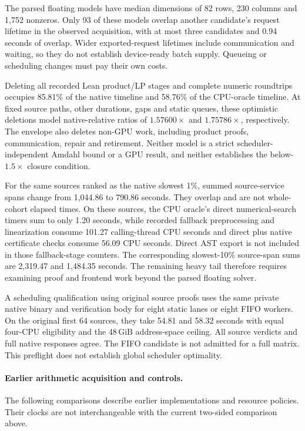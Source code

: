 \documentclass[10pt,twocolumn]{article}
\begin{document}
The parsed floating models have median dimensions of 82 rows, 230 columns
and 1,752 nonzeros. Only 93 of these models overlap another candidate's
request lifetime in the observed acquisition, with at most three candidates
and 0.94 seconds of overlap. Wider exported-request lifetimes include
communication and waiting, so they do not establish device-ready batch supply.
Queueing or scheduling changes must pay their own costs.

Deleting all recorded Lean product/LP stages and complete numeric roundtrips
occupies 85.81\% of the native timeline and 58.76\% of the CPU-oracle timeline.
At fixed source paths, other durations, gaps and static queues, these
optimistic deletions model native-relative ratios of $1.57600\times$ and
$1.75786\times$, respectively. The envelope also deletes non-GPU work,
including product proofs, communication, repair and retirement. Neither
model is a strict scheduler-independent Amdahl bound or a GPU result,
and neither establishes the below-$1.5\times$ closure condition.

For the same sources ranked as the native slowest 1\%, summed source-service
spans change from 1,044.86 to 790.86 seconds. They overlap and are not
whole-cohort elapsed times. On these sources, the CPU oracle's direct
numerical-search timers sum to only 1.20 seconds, while recorded fallback
preprocessing and linearization consume 101.27 calling-thread CPU seconds
and direct plus native certificate checks consume 56.09 CPU seconds.
Direct AST export is not included in those fallback-stage counters.
The corresponding slowest-10\% source-span sums are 2,319.47 and
1,484.35 seconds. The remaining heavy tail therefore requires examining
proof and frontend work beyond the parsed floating solver.

A scheduling qualification using original source proofs uses the same private native binary
and verification body for eight static lanes or eight FIFO workers.
On the original first 64 sources, they take 54.81 and 58.32 seconds with equal
four-CPU eligibility and the 48\,GiB address-space ceiling. All source verdicts
and full native responses agree. The FIFO candidate is not admitted for a
full matrix. This preflight does not establish global scheduler optimality.


\paragraph{Earlier arithmetic acquisition and controls.}
The following comparisons describe earlier implementations and resource policies. Their clocks are not interchangeable with the current two-sided comparison above.
\end{document}
